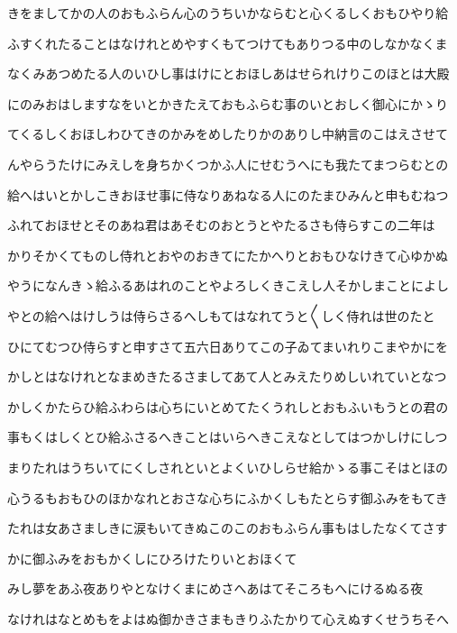 \documentclass[a4paper,11pt,landscape]{ltjtarticle}
\begin{document}
\par\medskip
きをましてかの人のおもふらん心のうちいかならむと心くるしくおもひやり給
\par\medskip
ふすくれたることはなけれとめやすくもてつけてもありつる中のしなかなくま
\par\medskip
なくみあつめたる人のいひし事はけにとおほしあはせられけりこのほとは大殿
\par\medskip
にのみおはしますなをいとかきたえておもふらむ事のいとおしく御心にかゝり
\par\medskip
てくるしくおほしわひてきのかみをめしたりかのありし中納言のこはえさせて
\par\medskip
んやらうたけにみえしを身ちかくつかふ人にせむうへにも我たてまつらむとの
\par\medskip
給へはいとかしこきおほせ事に侍なりあねなる人にのたまひみんと申もむねつ
\par\medskip
ふれておほせとそのあね君はあそむのおとうとやたるさも侍らすこの二年は
\par\medskip
かりそかくてものし侍れとおやのおきてにたかへりとおもひなけきて心ゆかぬ
\par\medskip
やうになんきゝ給ふるあはれのことやよろしくきこえし人そかしまことによし
\par\medskip
やとの給へはけしうは侍らさるへしもてはなれてうと〱しく侍れは世のたと
\par\medskip
ひにてむつひ侍らすと申すさて五六日ありてこの子ゐてまいれりこまやかにを
\par\medskip
かしとはなけれとなまめきたるさましてあて人とみえたりめしいれていとなつ
\par\medskip
かしくかたらひ給ふわらは心ちにいとめてたくうれしとおもふいもうとの君の
\par\medskip
事もくはしくとひ給ふさるへきことはいらへきこえなとしてはつかしけにしつ
\par\medskip
まりたれはうちいてにくしされといとよくいひしらせ給かゝる事こそはとほの
\par\medskip
心うるもおもひのほかなれとおさな心ちにふかくしもたとらす御ふみをもてき
\par\medskip
たれは女あさましきに涙もいてきぬこのこのおもふらん事もはしたなくてさす
\par\medskip
かに御ふみをおもかくしにひろけたりいとおほくて
\par\medskip
みし夢をあふ夜ありやとなけくまにめさへあはてそころもへにけるぬる夜
\par\medskip
なけれはなとめもをよはぬ御かきさまもきりふたかりて心えぬすくせうちそへ
\par\medskip
\end{document}
